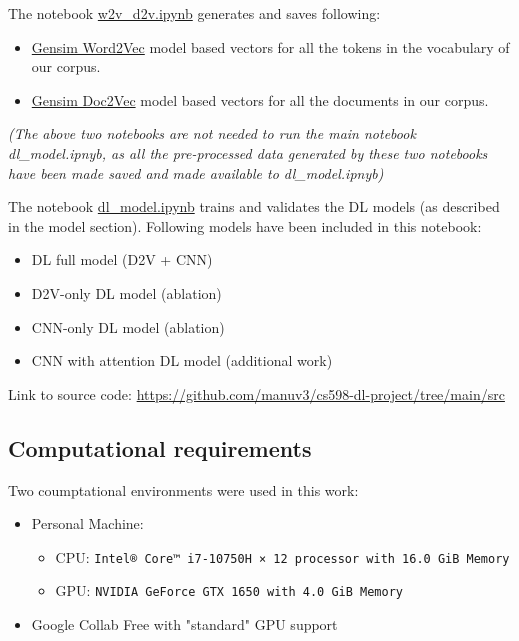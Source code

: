 \documentclass[11pt,a4paper]{article}
\begin{document}
The notebook \href{https://github.com/manuv3/cs598-dl-project/blob/main/src/w2v\_d2v.ipynb}{w2v\_d2v.ipynb} generates and saves following:
	\begin{itemize}
		\item \href{https://radimrehurek.com/gensim/models/word2vec.html}{Gensim Word2Vec} model based vectors for all the tokens in the vocabulary of our corpus.
		\item \href{https://radimrehurek.com/gensim/models/doc2vec.html}{Gensim Doc2Vec} model based vectors for all the documents in our corpus.
	\end{itemize}

\textit{(The above two notebooks are not needed to run the main notebook dl\_model.ipnyb, as all the pre-processed data generated by these two notebooks have been made saved and made available to dl\_model.ipnyb)}
	
The notebook \href{https://github.com/manuv3/cs598-dl-project/blob/main/src/dl\_model.ipynb}{dl\_model.ipynb} trains and validates the DL models (as described in the model section). Following models have been included in this notebook:
		\begin{itemize}
			\item DL full model (D2V + CNN)
			\item D2V-only DL model (ablation)
			\item CNN-only DL model (ablation)
			\item CNN with attention DL model (additional work)
		\end{itemize}

Link to source code: \url{https://github.com/manuv3/cs598-dl-project/tree/main/src}


\subsection{Computational requirements}

Two coumptational environments were used in this work:
\begin{itemize}
	\item Personal Machine: 
	\begin{itemize}
		\item CPU: \texttt{Intel® Core™ i7-10750H × 12 processor with 16.0 GiB Memory}
		\item GPU: \texttt{NVIDIA GeForce GTX 1650 with 4.0 GiB Memory}
	\end{itemize}
	\item Google Collab Free with "standard" GPU support
\end{itemize}
\end{document}
